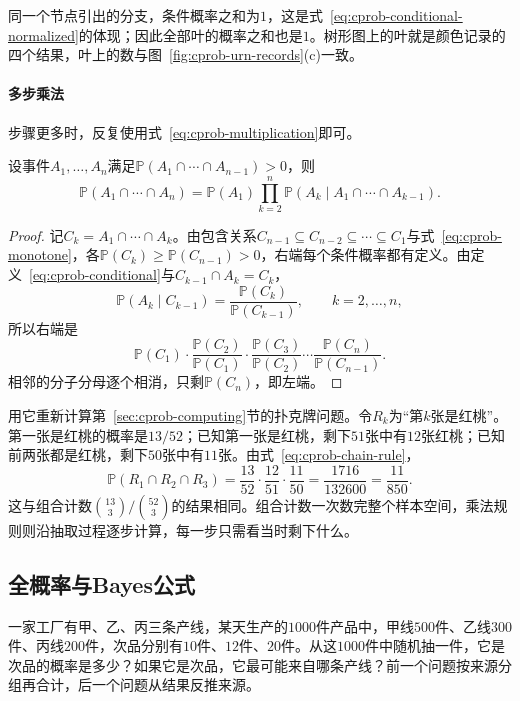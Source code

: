 同一个节点引出的分支，条件概率之和为$1$，这是式~\eqref{eq:cprob-conditional-normalized}的体现；因此全部叶的概率之和也是$1$。树形图上的叶就是颜色记录的四个结果，叶上的数与图~\ref{fig:cprob-urn-records}(c)一致。

\paragraph{多步乘法}
步骤更多时，反复使用式~\eqref{eq:cprob-multiplication}即可。

\begin{theorem}[多步乘法规则]
\label{thm:cprob-chain-rule}
设事件$A_1,\ldots,A_n$满足$\mathbb{P}(A_1\cap\cdots\cap A_{n-1})>0$，则
\begin{equation}
 \mathbb{P}(A_1\cap\cdots\cap A_n)
 =\mathbb{P}(A_1)\prod_{k=2}^{n}\mathbb{P}(A_k\mid A_1\cap\cdots\cap A_{k-1}).
 \label{eq:cprob-chain-rule}
\end{equation}
\end{theorem}

\begin{proof}
记$C_k=A_1\cap\cdots\cap A_k$。由包含关系$C_{n-1}\subseteq C_{n-2}\subseteq\cdots\subseteq C_1$与式~\eqref{eq:cprob-monotone}，各$\mathbb{P}(C_k)\geq\mathbb{P}(C_{n-1})>0$，右端每个条件概率都有定义。由定义~\eqref{eq:cprob-conditional}与$C_{k-1}\cap A_k=C_k$，
\[
 \mathbb{P}(A_k\mid C_{k-1})=\frac{\mathbb{P}(C_k)}{\mathbb{P}(C_{k-1})},\qquad k=2,\ldots,n,
\]
所以右端是
\[
 \mathbb{P}(C_1)\cdot\frac{\mathbb{P}(C_2)}{\mathbb{P}(C_1)}\cdot\frac{\mathbb{P}(C_3)}{\mathbb{P}(C_2)}\cdots\frac{\mathbb{P}(C_n)}{\mathbb{P}(C_{n-1})}.
\]
相邻的分子分母逐个相消，只剩$\mathbb{P}(C_n)$，即左端。
\end{proof}

用它重新计算第~\ref{sec:cprob-computing}节的扑克牌问题。令$R_k$为“第$k$张是红桃”。第一张是红桃的概率是$13/52$；已知第一张是红桃，剩下$51$张中有$12$张红桃；已知前两张都是红桃，剩下$50$张中有$11$张。由式~\eqref{eq:cprob-chain-rule}，
\[
 \mathbb{P}(R_1\cap R_2\cap R_3)=\frac{13}{52}\cdot\frac{12}{51}\cdot\frac{11}{50}=\frac{1716}{132600}=\frac{11}{850}.
\]
这与组合计数$\binom{13}{3}/\binom{52}{3}$的结果相同。组合计数一次数完整个样本空间，乘法规则则沿抽取过程逐步计算，每一步只需看当时剩下什么。

\subsection{全概率与Bayes公式}
\label{sec:cprob-total-bayes}

一家工厂有甲、乙、丙三条产线，某天生产的$1000$件产品中，甲线$500$件、乙线$300$件、丙线$200$件，次品分别有$10$件、$12$件、$20$件。从这$1000$件中随机抽一件，它是次品的概率是多少？如果它是次品，它最可能来自哪条产线？前一个问题按来源分组再合计，后一个问题从结果反推来源。

